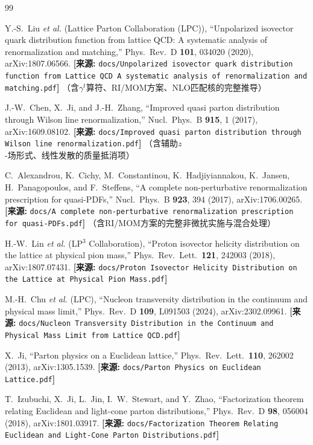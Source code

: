 \documentclass[12pt,a4paper]{ctexart}
\theoremstyle{definition}
\begin{document}
\begin{thebibliography}{99}

Y.-S.~Liu \textit{et al.} (Lattice Parton Collaboration (LPC)),
``Unpolarized isovector quark distribution function from lattice QCD: A systematic analysis of renormalization and matching,''
Phys.\ Rev.\ D \textbf{101}, 034020 (2020), arXiv:1807.06566.
\quad\textbf{[来源:} \texttt{docs/Unpolarized isovector quark distribution function from Lattice QCD A systematic analysis of renormalization and matching.pdf}\textbf{]}
（含$\gamma^t$算符、RI/MOM方案、NLO匹配核的完整推导）

J.-W.~Chen, X.~Ji, and J.-H.~Zhang,
``Improved quasi parton distribution through Wilson line renormalization,''
Nucl.\ Phys.\ B \textbf{915}, 1 (2017), arXiv:1609.08102.
\quad\textbf{[来源:} \texttt{docs/Improved quasi parton distribution through Wilson line renormalization.pdf}\textbf{]}
（含辅助$z$-场形式、线性发散的质量抵消项）

C.~Alexandrou, K.~Cichy, M.~Constantinou, K.~Hadjiyiannakou, K.~Jansen, H.~Panagopoulos, and F.~Steffens,
``A complete non-perturbative renormalization prescription for quasi-PDFs,''
Nucl.\ Phys.\ B \textbf{923}, 394 (2017), arXiv:1706.00265.
\quad\textbf{[来源:} \texttt{docs/A complete non-perturbative renormalization prescription for quasi-PDFs.pdf}\textbf{]}
（含RI/MOM方案的完整非微扰实施与混合处理）

H.-W.~Lin \textit{et al.} (LP$^3$ Collaboration),
``Proton isovector helicity distribution on the lattice at physical pion mass,''
Phys.\ Rev.\ Lett.\ \textbf{121}, 242003 (2018), arXiv:1807.07431.
\quad\textbf{[来源:} \texttt{docs/Proton Isovector Helicity Distribution on the Lattice at Physical Pion Mass.pdf}\textbf{]}

M.-H.~Chu \textit{et al.} (LPC),
``Nucleon transversity distribution in the continuum and physical mass limit,''
Phys.\ Rev.\ D \textbf{109}, L091503 (2024), arXiv:2302.09961.
\quad\textbf{[来源:} \texttt{docs/Nucleon Transversity Distribution in the Continuum and Physical Mass Limit from Lattice QCD.pdf}\textbf{]}

X.~Ji,
``Parton physics on a Euclidean lattice,''
Phys.\ Rev.\ Lett.\ \textbf{110}, 262002 (2013), arXiv:1305.1539.
\quad\textbf{[来源:} \texttt{docs/Parton Physics on Euclidean Lattice.pdf}\textbf{]}

T.~Izubuchi, X.~Ji, L.~Jin, I.~W.~Stewart, and Y.~Zhao,
``Factorization theorem relating Euclidean and light-cone parton distributions,''
Phys.\ Rev.\ D \textbf{98}, 056004 (2018), arXiv:1801.03917.
\quad\textbf{[来源:} \texttt{docs/Factorization Theorem Relating Euclidean and Light-Cone Parton Distributions.pdf}\textbf{]}


\end{thebibliography}
\end{document}

